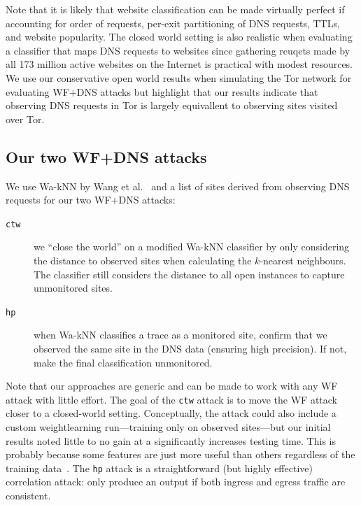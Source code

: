 Note that it is likely that website classification can be made
virtually perfect if accounting for order of requests, per-exit partitioning of
DNS requests, TTLs, and website popularity. The closed world setting
is also realistic when evaluating a classifier that maps DNS requests to
websites since gathering reuqets made by all 173 million active websites on the
Internet is practical with modest resources.
We use our conservative open world results when simulating the Tor network for
evaluating WF+DNS attacks but
highlight that our results indicate that observing DNS requests in Tor is
largely equivallent to observing sites visited over Tor.

\subsection{Our two WF+DNS attacks}
We use Wa-kNN by Wang et al.~\cite{Wang2014a} and a list of sites derived from
observing DNS requests for our two WF+DNS attacks:

\begin{description}
	\item[\texttt{ctw}] we ``close the world''
	on a modified Wa-kNN classifier by only considering the distance to observed
	sites when calculating the $k$-nearest neighbours. The classifier still
	considers the distance to all open instances to capture unmonitored sites.
	\item[\texttt{hp}] when Wa-kNN classifies a trace as a monitored site, confirm
	that we observed the same site in the DNS data (ensuring high precision). If
	not, make the final classification unmonitored.
\end{description}

Note that our approaches are generic and can be made to work with any WF attack
with little effort. The goal of the \texttt{ctw} attack is to move the WF attack
closer to a closed-world setting. Conceptually, the attack could also include
a custom weightlearning run---training only on observed sites---but our initial
results noted little to no gain at a significantly increases testing time.
This is probably because some features are just more useful than others
regardless of the training data~\cite{kfingerprinting}. The \texttt{hp} attack
is a straightforward (but highly effective) correlation attack: only produce
an output if both ingress and egress traffic are consistent.

